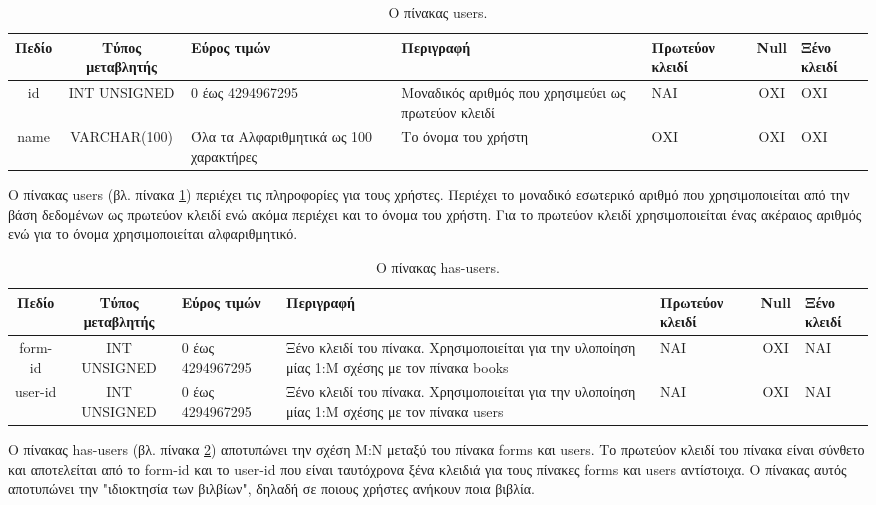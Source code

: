 \documentclass{assignment}
\begin{document}
\begin{landscape}
\begin{table}[htbp]
\begin{center}
  \begin{tabular}{|c|c|m{}|m{}|m{2.0cm}|c|m{1.5cm}|}
    \hline
    {\bf Πεδίο} & {\bf Τύπος μεταβλητής} & {\bf Εύρος τιμών} & {\bf Περιγραφή} & {\bf Πρωτεύον κλειδί} & {\bf Null} & {\bf Ξένο κλειδί} \\ \hline
    id & INT UNSIGNED & 0 έως 4294967295 & Μοναδικός αριθμός που χρησιμεύει ως πρωτεύον κλειδί & ΝΑΙ & ΟΧΙ & ΟΧΙ \\ \hline
    name & VARCHAR(100) & Όλα τα Αλφαριθμητικά ως 100 χαρακτήρες & Το όνομα του χρήστη & ΟΧΙ & ΟΧΙ & ΟΧΙ \\ \hline
  \end{tabular}
\caption{Ο πίνακας users.}
\label{table:db_table:users}
\end{center}
\end{table}

Ο πίνακας users (βλ. πίνακα \ref{table:db_table:users}) περιέχει τις πληροφορίες για τους χρήστες. Περιέχει το μοναδικό εσωτερικό αριθμό που χρησιμοποιείται από την βάση δεδομένων ως πρωτεύον κλειδί ενώ ακόμα περιέχει και το όνομα του χρήστη. Για το πρωτεύον κλειδί χρησιμοποιείται ένας ακέραιος αριθμός ενώ για το όνομα χρησιμοποιείται αλφαριθμητικό. \\

\begin{table}[htbp]
\begin{center}
  \begin{tabular}{|c|c|m{}|m{}|m{2.0cm}|c|m{1.5cm}|}
    \hline
    {\bf Πεδίο} & {\bf Τύπος μεταβλητής} & {\bf Εύρος τιμών} & {\bf Περιγραφή} & {\bf Πρωτεύον κλειδί} & {\bf Null} & {\bf Ξένο κλειδί} \\ \hline
    form-id & INT UNSIGNED & 0 έως 4294967295 & Ξένο κλειδί του πίνακα. Χρησιμοποιείται για την υλοποίηση μίας 1:Μ σχέσης με τον πίνακα books & ΝΑΙ & ΟΧΙ & NAI \\ \hline
    user-id & INT UNSIGNED & 0 έως 4294967295 & Ξένο κλειδί του πίνακα. Χρησιμοποιείται για την υλοποίηση μίας 1:Μ σχέσης με τον πίνακα users & ΝΑΙ & ΟΧΙ & NAI \\ \hline
  \end{tabular}
\caption{Ο πίνακας has-users.}
\label{table:db_table:has-users}
\end{center}
\end{table}

Ο πίνακας has-users (βλ. πίνακα \ref{table:db_table:has-users}) αποτυπώνει την σχέση Μ:Ν μεταξύ του πίνακα forms και users. Το πρωτεύον κλειδί του πίνακα είναι σύνθετο και αποτελείται από το form-id και το user-id που είναι ταυτόχρονα ξένα κλειδιά για τους πίνακες  forms και users αντίστοιχα. Ο πίνακας αυτός αποτυπώνει την "ιδιοκτησία των βιλβίων", δηλαδή σε ποιους χρήστες ανήκουν ποια βιβλία.
\end{landscape}
\end{document}
